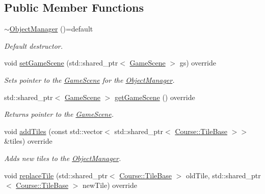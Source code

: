 \subsection*{Public Member Functions}
\begin{DoxyCompactItemize}
\item 
\hypertarget{class_student_1_1_object_manager_a7fc08f7e2eaeb07466a667cab4cd4a5f}{\hyperlink{class_student_1_1_object_manager_a7fc08f7e2eaeb07466a667cab4cd4a5f}{$\sim$\-Object\-Manager} ()=default}\label{class_student_1_1_object_manager_a7fc08f7e2eaeb07466a667cab4cd4a5f}

\begin{DoxyCompactList}\small\item\em Default destructor. \end{DoxyCompactList}\item 
void \hyperlink{class_student_1_1_object_manager_a373b6a5f09885f8b163ff529a42530f0}{set\-Game\-Scene} (std\-::shared\-\_\-ptr$<$ \hyperlink{class_student_1_1_game_scene}{Game\-Scene} $>$ gs) override
\begin{DoxyCompactList}\small\item\em Sets pointer to the \hyperlink{class_student_1_1_game_scene}{Game\-Scene} for the \hyperlink{class_student_1_1_object_manager}{Object\-Manager}. \end{DoxyCompactList}\item 
std\-::shared\-\_\-ptr$<$ \hyperlink{class_student_1_1_game_scene}{Game\-Scene} $>$ \hyperlink{class_student_1_1_object_manager_ae06bc95169a9304d83b70f51623401fa}{get\-Game\-Scene} () override
\begin{DoxyCompactList}\small\item\em Returns pointer to the \hyperlink{class_student_1_1_game_scene}{Game\-Scene}. \end{DoxyCompactList}\item 
void \hyperlink{class_student_1_1_object_manager_ae8dec4f7c5cb058f4451a95c18dfdf7a}{add\-Tiles} (const std\-::vector$<$ std\-::shared\-\_\-ptr$<$ \hyperlink{class_course_1_1_tile_base}{Course\-::\-Tile\-Base} $>$$>$ \&tiles) override
\begin{DoxyCompactList}\small\item\em Adds new tiles to the \hyperlink{class_student_1_1_object_manager}{Object\-Manager}. \end{DoxyCompactList}\item 
void \hyperlink{class_student_1_1_object_manager_aabd37c052d8ffb1d50664b0874926ac1}{replace\-Tile} (std\-::shared\-\_\-ptr$<$ \hyperlink{class_course_1_1_tile_base}{Course\-::\-Tile\-Base} $>$ old\-Tile, std\-::shared\-\_\-ptr$<$ \hyperlink{class_course_1_1_tile_base}{Course\-::\-Tile\-Base} $>$ new\-Tile) override
$$
\end{DoxyCompactItemize}
